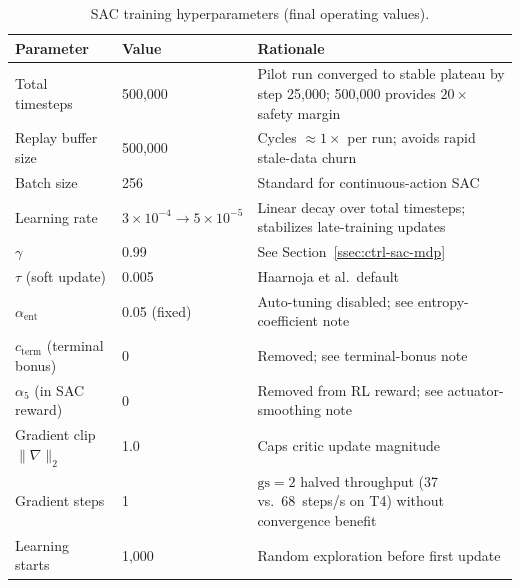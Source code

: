\begin{table}[h]
\centering
\caption{SAC training hyperparameters (final operating values).}
\label{tab:sac-hp}
\begin{tabular}{llp{6.5cm}}
\toprule
\textbf{Parameter} & \textbf{Value} & \textbf{Rationale} \\
\midrule
Total timesteps     & 500{,}000       & Pilot run converged to stable plateau by step 25{,}000; 500{,}000 provides $20\times$ safety margin \\
Replay buffer size  & 500{,}000       & Cycles $\approx$$1\times$ per run; avoids rapid stale-data churn \\
Batch size          & 256             & Standard for continuous-action SAC \\
Learning rate       & $3\!\times\!10^{-4} \to 5\!\times\!10^{-5}$ & Linear decay over total timesteps; stabilizes late-training updates \\
$\gamma$            & 0.99            & See Section~\ref{ssec:ctrl-sac-mdp} \\
$\tau$ (soft update)& 0.005           & Haarnoja et al.\ default \\
$\alpha_{\mathrm{ent}}$ & 0.05 (fixed)& Auto-tuning disabled; see entropy-coefficient note \\
$c_{\mathrm{term}}$ (terminal bonus) & 0 & Removed; see terminal-bonus note \\
$\alpha_5$ (in SAC reward)            & 0 & Removed from RL reward; see actuator-smoothing note \\
Gradient clip $\|\nabla\|_2$ & 1.0 & Caps critic update magnitude \\
Gradient steps      & 1               & $\mathrm{gs}=2$ halved throughput (37 vs.\ 68~steps/s on T4) without convergence benefit \\
Learning starts     & 1{,}000         & Random exploration before first update \\
\bottomrule
\end{tabular}
\end{table}

